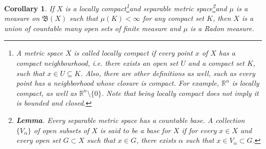\documentclass[11pt]{book}
\newtheorem{corollary}{Corollary}[theorem]
\theoremstyle{definition}
\numberwithin{equation}{chapter}
\begin{document}
\begin{corollary}\label{coro_192}
If $X$ is a locally compact\footnote{A metric space $X$ is called {\em locally compact} if every point $x$ of $X$ has a compact neighbourhood, i.e. there exists an open set $U$ and a compact set $K$, such that $x\in U \subseteq K$. Also, there are other definitions as well, such as every point has a neighborhood whose closure is compact. For example, $\mathbb{R}^n$ is locally compact, as well as $\mathbb{R}^n \setminus \{0\}$. Note that being locally compact does not imply it is bounded and closed.}and separable metric space\footnote{{\bf Lemma}. Every separable metric space has a countable base\cite{10}. A collection $\{V_\alpha\}$ of open subsets of $X$ is said to be a {\em base} for $X$ if for every $x\in X$ and every open set $G \subset X$ such that $x \in G$, there exists $\alpha$ such that $x \in V_\alpha \subset G$.}and $\mu$ is a measure on $\mathfrak{B}(X)$ such that $\mu(K) < \infty$ for any compact set $K$, then $X$ is a union of countable many open sets of finite measure and $\mu$ is a Radon measure.
\end{corollary}
\end{document}
